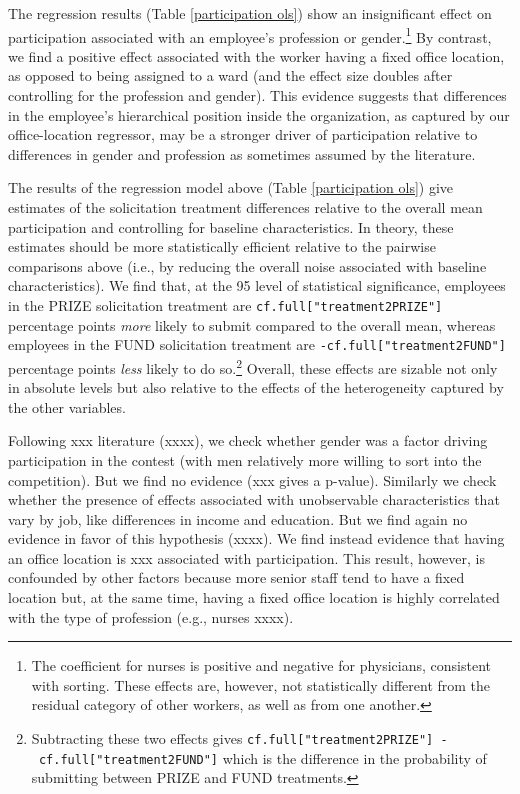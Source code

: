 \documentclass[12pt, titlepage]{article}
\begin{document}


The regression results (Table \ref{participation ols}) show an
insignificant effect on participation associated with an employee's
profession or gender.\footnote{The coefficient for nurses is positive
  and negative for physicians, consistent with sorting. These effects
  are, however, not statistically different from the residual category
  of other workers, as well as from one another.} By contrast, we find a
positive effect associated with the worker having a fixed office
location, as opposed to being assigned to a ward (and the effect size
doubles after controlling for the profession and gender). This evidence
suggests that differences in the employee's hierarchical position inside
the organization, as captured by our office-location regressor, may be a
stronger driver of participation relative to differences in gender and
profession as sometimes assumed by the literature.

The results of the regression model above (Table
\ref{participation ols}) give estimates of the solicitation treatment
differences relative to the overall mean participation and controlling
for baseline characteristics. In theory, these estimates should be more
statistically efficient relative to the pairwise comparisons above
(i.e., by reducing the overall noise associated with baseline
characteristics). We find that, at the 95 level of statistical
significance, employees in the PRIZE solicitation treatment are
\texttt{cf.full{[}"treatment2PRIZE"{]}} percentage points \emph{more}
likely to submit compared to the overall mean, whereas employees in the
FUND solicitation treatment are \texttt{-cf.full{[}"treatment2FUND"{]}}
percentage points \emph{less} likely to do so.\footnote{Subtracting
  these two effects gives
  \texttt{cf.full{[}"treatment2PRIZE"{]}\ -\ cf.full{[}"treatment2FUND"{]}}
  which is the difference in the probability of submitting between PRIZE
  and FUND treatments.} Overall, these effects are sizable not only in
absolute levels but also relative to the effects of the heterogeneity
captured by the other variables.

Following xxx literature (xxxx), we check whether gender was a factor
driving participation in the contest (with men relatively more willing
to sort into the competition). But we find no evidence (xxx gives a
p-value). Similarly we check whether the presence of effects associated
with unobservable characteristics that vary by job, like differences in
income and education. But we find again no evidence in favor of this
hypothesis (xxxx). We find instead evidence that having an office
location is xxx associated with participation. This result, however, is
confounded by other factors because more senior staff tend to have a
fixed location but, at the same time, having a fixed office location is
highly correlated with the type of profession (e.g., nurses xxxx).
\end{document}
